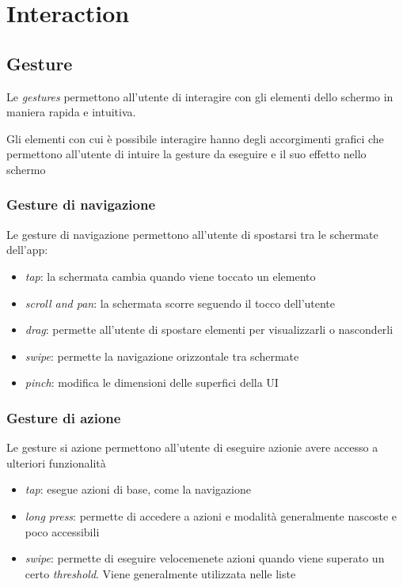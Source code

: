 \documentclass[12pt, a4paper]{report}
\begin{document}
	\section{Interaction}

		\subsection{Gesture}	
		Le \textit{gestures} permettono all'utente di interagire con gli elementi dello schermo in maniera rapida e intuitiva.
		
		Gli elementi con cui è possibile interagire hanno degli accorgimenti grafici che permettono all'utente di intuire la gesture da eseguire e il suo effetto nello schermo
		
			\subsubsection{Gesture di navigazione}
			Le gesture di navigazione permettono all'utente di spostarsi tra le schermate dell'app:
			\begin{itemize}
				\item \textit{tap}: la schermata cambia quando viene toccato un elemento
				\item \textit{scroll and pan}: la schermata scorre seguendo il tocco dell'utente
				\item \textit{drag}: permette all'utente di spostare elementi per visualizzarli o nasconderli
				\item \textit{swipe}: permette la navigazione orizzontale tra schermate
				\item \textit{pinch}: modifica le dimensioni delle superfici della UI
			\end{itemize}
			
			\subsubsection{Gesture di azione}
			Le gesture si azione permettono all'utente di eseguire azionie avere accesso a ulteriori funzionalità
			\begin{itemize}
				\item \textit{tap}: esegue azioni di base, come la navigazione 
				\item \textit{long press}: permette di accedere a azioni e modalità generalmente nascoste e poco accessibili
				\item \textit{swipe}: permette di eseguire velocemenete azioni quando viene superato un certo \textit{threshold}. Viene generalmente utilizzata nelle liste
			\end{itemize}
			
\end{document}
